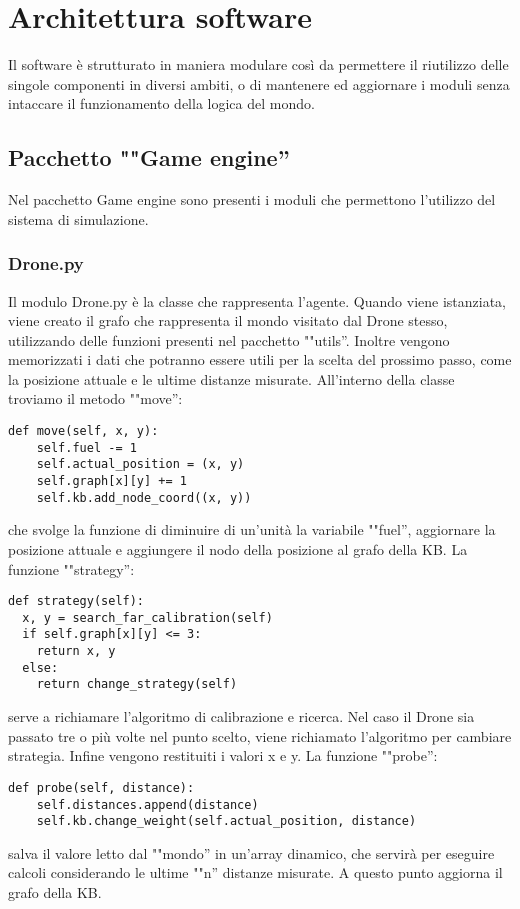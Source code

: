 \section{Architettura software}
Il software è strutturato in maniera modulare così da permettere il riutilizzo delle singole componenti in diversi ambiti, o di mantenere ed aggiornare i moduli senza intaccare il funzionamento della logica del mondo.

\subsection{Pacchetto ""Game engine''}
Nel pacchetto Game engine sono presenti i moduli che permettono l'utilizzo del sistema di simulazione.


\subsubsection{Drone.py}
Il modulo Drone.py è la classe che rappresenta l'agente. Quando viene istanziata, viene creato il grafo che rappresenta il mondo visitato dal Drone stesso, utilizzando delle funzioni presenti nel pacchetto ""utils''. Inoltre vengono memorizzati i dati che potranno essere utili per la scelta del prossimo passo, come la posizione attuale e le ultime distanze misurate. 
All'interno della classe troviamo il metodo ""move'':
\begin{verbatim}
def move(self, x, y):
    self.fuel -= 1
    self.actual_position = (x, y)
    self.graph[x][y] += 1
    self.kb.add_node_coord((x, y))
\end{verbatim}
che svolge la funzione di diminuire di un'unità la variabile ""fuel'', aggiornare la posizione attuale e aggiungere il nodo della posizione al grafo della KB. 
La funzione ""strategy'':
\begin{verbatim}
def strategy(self):
  x, y = search_far_calibration(self)
  if self.graph[x][y] <= 3:
    return x, y
  else:
    return change_strategy(self)
\end{verbatim}
serve a richiamare l'algoritmo di calibrazione e ricerca. Nel caso il Drone sia passato tre o più volte nel punto scelto, viene richiamato l'algoritmo per cambiare strategia. Infine vengono restituiti i valori x e y. 
La funzione ""probe'':
\begin{verbatim}
def probe(self, distance):
    self.distances.append(distance)
    self.kb.change_weight(self.actual_position, distance)
\end{verbatim}
salva il valore letto dal ""mondo'' in un'array dinamico, che servirà per eseguire calcoli considerando le ultime ""n'' distanze misurate. A questo punto aggiorna il grafo della KB. 

